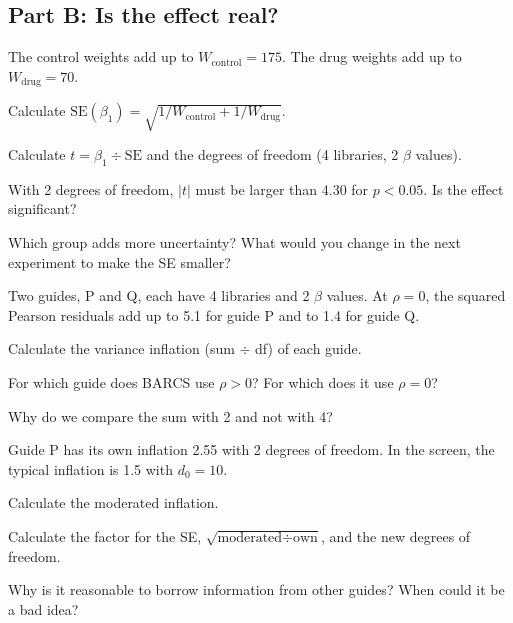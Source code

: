 \subsection*{Part B: Is the effect real?}
\begin{exlist}[resume*=ex2]
\item \tagcalc{} \tagexplain{} The control weights add up to
$W_{\text{control}} = 175$. The drug weights add up to $W_{\text{drug}} = 70$.
\begin{parts}
\item Calculate $\text{SE}(\beta_1) = \sqrt{1/W_{\text{control}} +
  1/W_{\text{drug}}}$.
\item Calculate $t = \beta_1 \div \text{SE}$ and the degrees of freedom
  (4 libraries, 2 $\beta$ values).
\item With 2 degrees of freedom, $|t|$ must be larger than 4.30 for
  $p < 0.05$. Is the effect significant?
\item Which group adds more uncertainty? What would you change in the next
  experiment to make the SE smaller?
\end{parts}

\item \tagcalc{} \tagexplain{} Two guides, P and Q, each have 4 libraries and
2 $\beta$ values. At $\rho = 0$, the squared Pearson residuals add up to 5.1
for guide P and to 1.4 for guide Q.
\begin{parts}
\item Calculate the variance inflation (sum $\div$ df) of each guide.
\item For which guide does BARCS use $\rho > 0$? For which does it use
  $\rho = 0$?
\item Why do we compare the sum with 2 and not with 4?
\end{parts}

\item \tagcalc{} \tagexplain{} Guide P has its own inflation 2.55 with
2 degrees of freedom. In the screen, the typical inflation is 1.5 with
$d_0 = 10$.
\begin{parts}
\item Calculate the moderated inflation.
\item Calculate the factor for the SE, $\sqrt{\text{moderated} \div
  \text{own}}$, and the new degrees of freedom.
\item Why is it reasonable to borrow information from other guides? When
  could it be a bad idea?
\end{parts}
\end{exlist}

